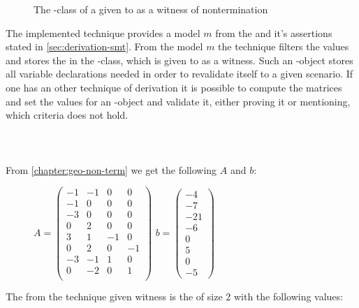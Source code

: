 \begin{wrapfigure}{R}{0.5\textwidth}
	\centering
	
	\caption{The -class of a \gna given to \aprove as a witness of nontermination}	
	\label{dia:gna-classdiagram}
\end{wrapfigure}
The implemented technique provides a model $m$ from the \solver and it's assertions stated in \autoref{sec:derivation-smt}. From the model $m$ the technique filters the values and stores the in the \gna-class, which is given to \aprove as a witness. Such an \gna-object stores all variable declarations needed in order to revalidate itself to a given scenario. If one has an other technique of derivation it is possible to compute the matrices and set the values for an \gna-object and validate it, either proving it or mentioning, which criteria does not hold.\\ 
\\
\\
\\
From \autoref{chapter:geo-non-term} we get the following \iterationmatrix $A$ and \iterationconstants $b$: 
\begin{figure}[H]
	\centering
	$A=\begin{pmatrix}
		-1 		& -1 		&  0		& 0		 \\
		-1 		& 0 		&  0		& 0		 \\
		-3 		& 0 		&  0		& 0		 \\
		0 		& 2 		&  0		& 0		 \\
		3 		& 1 		&  -1		& 0		 \\
		0 		& 2 		&  0		& -1	 \\
		-3 		& -1 		&  1		& 0		 \\
		0 		& -2 		&  0		& 1	 	 \\
	\end{pmatrix}$	
	$b=\begin{pmatrix}
		-4 \\ -7 \\ -21 \\ -6 \\ 0 \\ 5 \\ 0 \\ -5
	\end{pmatrix}$
\end{figure}
The from the technique given witness is the \gna of size 2 with the following values:
